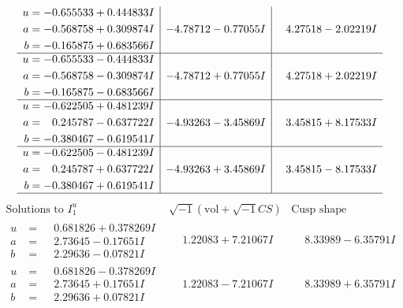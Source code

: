 \documentclass[1p]{elsarticle_modified}
\theoremstyle{definition}
\newcommand{\I}{\sqrt{-1}}
\begin{document}
$$\begin{array}{c|c|c}
\begin{aligned}
u &= -0.655533 + 0.444833 I \\
a &= -0.568758 + 0.309874 I \\
b &= -0.165875 + 0.683566 I\end{aligned}
 & -4.78712 - 0.77055 I & \phantom{-}4.27518 - 2.02219 I \\ \hline\begin{aligned}
u &= -0.655533 - 0.444833 I \\
a &= -0.568758 - 0.309874 I \\
b &= -0.165875 - 0.683566 I\end{aligned}
 & -4.78712 + 0.77055 I & \phantom{-}4.27518 + 2.02219 I \\ \hline\begin{aligned}
u &= -0.622505 + 0.481239 I \\
a &= \phantom{-}0.245787 - 0.637722 I \\
b &= -0.380467 - 0.619541 I\end{aligned}
 & -4.93263 - 3.45869 I & \phantom{-}3.45815 + 8.17533 I \\ \hline\begin{aligned}
u &= -0.622505 - 0.481239 I \\
a &= \phantom{-}0.245787 + 0.637722 I \\
b &= -0.380467 + 0.619541 I\end{aligned}
 & -4.93263 + 3.45869 I & \phantom{-}3.45815 - 8.17533 I\\
 \hline 
 \end{array}$$\newpage$$\begin{array}{c|c|c}  
\text{Solutions to }I^u_{1}& \I (\text{vol} + \sqrt{-1}CS) & \text{Cusp shape}\\
 \hline 
\begin{aligned}
u &= \phantom{-}0.681826 + 0.378269 I \\
a &= \phantom{-}2.73645 - 0.17651 I \\
b &= \phantom{-}2.29636 - 0.07821 I\end{aligned}
 & \phantom{-}1.22083 + 7.21067 I & \phantom{-}8.33989 - 6.35791 I \\ \hline\begin{aligned}
u &= \phantom{-}0.681826 - 0.378269 I \\
a &= \phantom{-}2.73645 + 0.17651 I \\
b &= \phantom{-}2.29636 + 0.07821 I\end{aligned}
 & \phantom{-}1.22083 - 7.21067 I & \phantom{-}8.33989 + 6.35791 I \\ \hline\begin{aligned}

\end{aligned}
\end{array}$$
\end{document}

